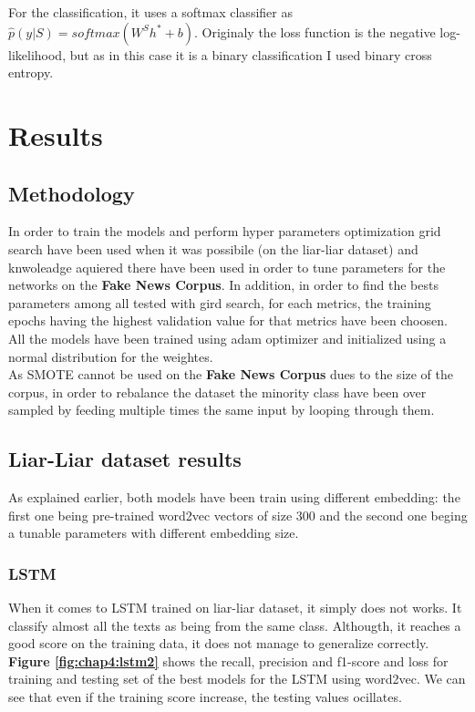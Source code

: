 For the classification, it uses a softmax classifier as $\hat{p}(y|S) = softmax(W^Sh^* + b)$. Originaly the loss function is the negative log-likelihood, but as in this case it is a binary classification I used binary cross entropy. 
\section{Results}
\subsection{Methodology}
In order to train the models and perform hyper parameters optimization grid search have been used when it was possibile (on the liar-liar dataset) and knwoleadge aquiered there have been used in order to tune parameters for the networks on the \textbf{Fake News Corpus}. In addition, in order to find the bests parameters among all tested with gird search, for each metrics, the training epochs having the highest validation value for that metrics have been choosen. \\

All the models have been trained using adam optimizer and initialized using a normal distribution for the weightes. \\

As SMOTE cannot be used on the \textbf{Fake News Corpus} dues to the size of the corpus, in order to rebalance the dataset the minority class have been over sampled by feeding multiple times the same input by looping through them. 
\subsection{Liar-Liar dataset results}
As explained earlier, both models have been train using different embedding: the first one being pre-trained word2vec vectors of size 300 and the second one beging a tunable parameters with different embedding size.
\subsubsection{LSTM}
When it comes to LSTM trained on liar-liar dataset, it simply does not works. It classify almost all the texts as being from the same class. Althougth, it reaches a good score on the training data, it does not manage to generalize correctly. \textbf{Figure \ref{fig:chap4:lstm2}} shows the recall, precision and f1-score and loss for training and testing set of the best models for the LSTM using word2vec. We can see that even if the training score increase, the testing values ocillates. \\

